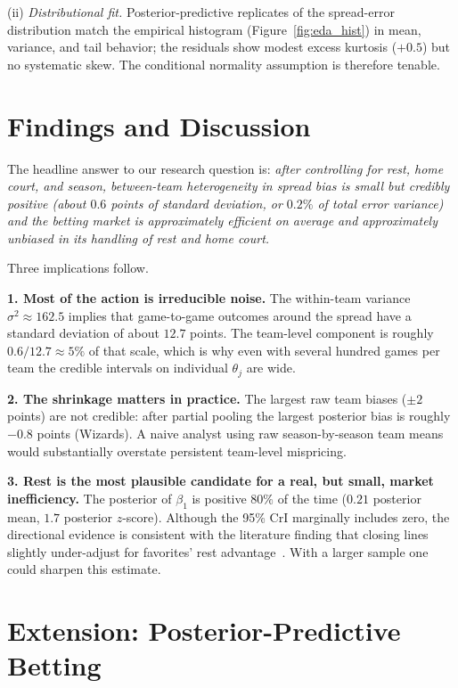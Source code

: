 \documentclass[11pt]{article}
\begin{document}
(ii) \emph{Distributional fit.} Posterior-predictive replicates of the
spread-error distribution match the empirical histogram (Figure~\ref{fig:eda_hist})
in mean, variance, and tail behavior; the residuals show modest excess
kurtosis ($+0.5$) but no systematic skew. The conditional normality
assumption is therefore tenable.

\section{Findings and Discussion}

The headline answer to our research question is:
\emph{after controlling for rest, home court, and season, between-team
heterogeneity in spread bias is small but credibly positive (about $0.6$
points of standard deviation, or $0.2\%$ of total error variance) and the
betting market is approximately efficient on average and approximately
unbiased in its handling of rest and home court.}

Three implications follow.

\textbf{1. Most of the action is irreducible noise.} The within-team variance
$\sigma^2 \approx 162.5$ implies that game-to-game outcomes around the spread
have a standard deviation of about $12.7$ points. The team-level component
is roughly $0.6/12.7 \approx 5\%$ of that scale, which is why even with
several hundred games per team the credible intervals on individual
$\theta_j$ are wide.

\textbf{2. The shrinkage matters in practice.} The largest raw team biases
($\pm 2$ points) are not credible: after partial pooling the largest
posterior bias is roughly $-0.8$ points (Wizards). A naive analyst using
raw season-by-season team means would substantially overstate persistent
team-level mispricing.

\textbf{3. Rest is the most plausible candidate for a real, but small, market
inefficiency.} The posterior of $\beta_1$ is positive $80\%$ of the time
($0.21$ posterior mean, $1.7$ posterior $z$-score). Although the 95\%
CrI marginally includes zero, the directional evidence is consistent with
the literature finding that closing lines slightly under-adjust for
favorites' rest advantage~\cite{levitt}. With a larger sample one could
sharpen this estimate.

\section{Extension: Posterior-Predictive Betting}
\end{document}
